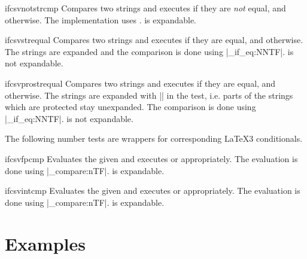 \documentclass[a4paper,11pt]{ltxdoc}
\begin{document}
\begin{docCommand}[doc new and updated={2016-07-01}{2021-06-28}]{ifcsvnotstrcmp}{}
  Compares two strings and executes  if they are \emph{not} equal, and  otherwise.
  The implementation uses .
   is expandable.
\end{docCommand}


\begin{docCommand}[doc new and updated={2016-07-01}{2021-06-28}]{ifcsvstrequal}{}
  Compares two strings and executes  if they are equal, and  otherwise.
  The strings are expanded
  and the comparison is done using |\tl_if_eq:NNTF|.
   is not expandable.
\end{docCommand}


\begin{docCommand}[doc new and updated={2016-07-01}{2021-06-28}]{ifcsvprostrequal}{}
  Compares two strings and executes  if they are equal, and  otherwise.
  The strings are expanded with |\protected@edef|
  in the test, i.e. parts of the
  strings which are protected stay unexpanded.
  The comparison is done using |\tl_if_eq:NNTF|.
   is not expandable.
\end{docCommand}


The following number tests are wrappers for corresponding \LaTeX3 conditionals.

\begin{docCommand}[doc new={2021-06-28}]{ifcsvfpcmp}{}
  Evaluates the given 
  and executes  or  appropriately.
  The evaluation is done using |\fp_compare:nTF|.
   is expandable.
\end{docCommand}

\begin{docCommand}[doc new={2021-06-28}]{ifcsvintcmp}{}
  Evaluates the given 
  and executes  or  appropriately.
  The evaluation is done using |\int_compare:nTF|.
   is expandable.
\end{docCommand}


\clearpage
\section{Examples}%
\end{document}

